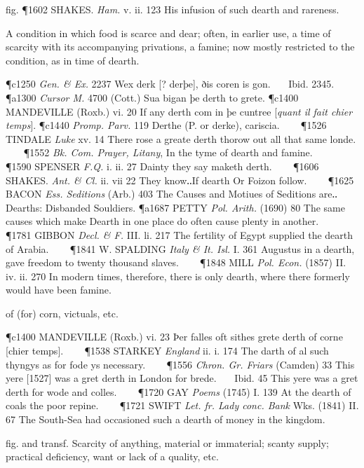 \begin{description}[wide, labelwidth=!, labelindent=0pt]
\begin{myenumerate}
fig. \P 1602 SHAKES.  \textit{Ham.} v. ii. 123 His infusion of such dearth and rareness.

 A condition in which food is scarce and dear; often, in earlier use, a time of scarcity with its accompanying privations, a famine; now mostly restricted to the condition, as in time of dearth.

\P c1250 \textit{Gen. \& Ex.}  2237 Wex derk [? derþe], ðis coren is gon.    Ibid. 2345.
\P a1300  \textit{Cursor M.} 4700 (Cott.) Sua bigan þe derth to grete.
\P c1400 MANDEVILLE  (Roxb.) vi. 20 If any derth com in þe cuntree [\textit{quant il fait chier temps}].
\P c1440  \textit{Promp. Parv.} 119 Derthe (P. or derke), cariscia.    
\P 1526 TINDALE  \textit{Luke} xv. 14 There rose a greate derth thorow out all that same londe.    
\P 1552  \textit{Bk. Com. Prayer, Litany}, In the tyme of dearth and famine.    
\P 1590 SPENSER  \textit{F.Q.} i. ii. 27 Dainty they say maketh derth.    
\P 1606 SHAKES.  \textit{Ant. \& Cl.} ii. vii 22 They know‥If dearth Or Foizon follow.    
\P 1625 BACON  \textit{Ess. Seditions} (Arb.) 403 The Causes and Motiues of Seditions are‥Dearths: Disbanded Souldiers.
\P a1687 PETTY  \textit{Pol. Arith.} (1690) 80 The same causes which make Dearth in one place do often cause plenty in another.    
\P 1781 GIBBON  \textit{Decl. \& F.} III. li. 217 The fertility of Egypt supplied the dearth of Arabia.    
\P 1841 W. SPALDING  \textit{Italy \& It. Isl.} I. 361 Augustus in a dearth, gave freedom to twenty thousand slaves.    
\P 1848 MILL  \textit{Pol. Econ.} (1857) II. iv. ii. 270 In modern times, therefore, there is only dearth, where there formerly would have been famine.

 of (for) corn, victuals, etc.

\P c1400 MANDEVILLE  (Roxb.) vi. 23 Þer falles oft sithes grete derth of corne [chier temps].    
\P 1538 STARKEY  \textit{England} ii. i. 174 The darth of al such thyngys as for fode ys necessary.    
\P 1556  \textit{Chron. Gr. Friars} (Camden) 33 This yere [1527] was a gret derth in London for brede.    Ibid. 45 This yere was a gret derth for wode and colles.    
\P 1720 GAY  \textit{Poems} (1745) I. 139 At the dearth of coals the poor repine.    
\P 1721 SWIFT  \textit{Let. fr. Lady conc. Bank} Wks. (1841) II. 67 The South-Sea had occasioned such a dearth of money in the kingdom.

 fig. and transf. Scarcity of anything, material or immaterial; scanty supply; practical deficiency, want or lack of a quality, etc.


\end{myenumerate}
\end{description}

